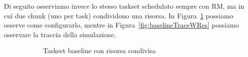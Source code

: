 \myskip

Di seguito osserviamo invece lo stesso taskset schedulato sempre con RM, ma in cui due chunk (uno per task) condividono una risorsa. In Figura~\ref{fig:baselineTasksetWRes} possiamo osserve come configurarlo, mentre in Figura~\ref{fig:baselineTraceWRes} possiamo osservare la traccia della simulazione.

\begin{figure}[htbp]
    \centering
    \begin{subfigure}{0.45\textwidth}
        \vfill
        \centering
        \caption{Taskset baseline con risorsa condivisa}
        \label{fig:baselineTasksetWRes}
        \vfill
    \end{subfigure}
    \hfill
    \begin{subfigure}{0.45\textwidth}
        \vfill
        \centering

\end{subfigure}
\end{figure}
